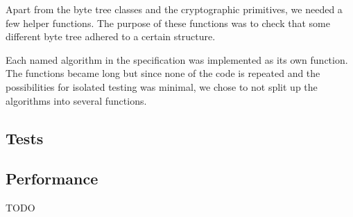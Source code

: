 Apart from the byte tree classes and the cryptographic primitives, we needed a few helper functions. The purpose of these functions was to check that some different byte tree adhered to a certain structure.

Each named algorithm in the specification was implemented as its own function. The functions became long but since none of the code is repeated and the possibilities for isolated testing was minimal, we chose to not split up the algorithms into several functions.

\subsection{Tests}


\subsection{Performance}

TODO